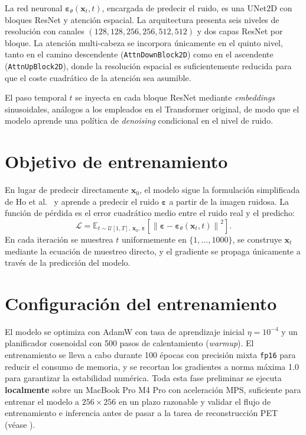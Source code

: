 La red neuronal $\boldsymbol{\varepsilon}_\theta(\mathbf{x}_t, t)$,
encargada de predecir el ruido, es una UNet2D con bloques ResNet
y atención espacial. La arquitectura presenta seis niveles de
resolución con canales $(128, 128, 256, 256, 512, 512)$ y dos
capas ResNet por bloque. La atención multi-cabeza se incorpora
únicamente en el quinto nivel, tanto en el camino descendente
(\texttt{AttnDownBlock2D}) como en el ascendente
(\texttt{AttnUpBlock2D}), donde la resolución espacial es
suficientemente reducida para que el coste cuadrático de la
atención sea asumible.

El paso temporal $t$ se inyecta en cada bloque ResNet mediante
\textit{embeddings} sinusoidales, análogos a los empleados en el
Transformer original, de modo que el modelo aprende una política
de \textit{denoising} condicional en el nivel de ruido.

\section{Objetivo de entrenamiento}
\label{sec:mariposas-loss}

En lugar de predecir directamente $\mathbf{x}_0$, el modelo sigue
la formulación simplificada de Ho et al.~\cite{ho2020ddpm} y
aprende a predecir el ruido $\boldsymbol{\varepsilon}$ a partir
de la imagen ruidosa. La función de pérdida es el error cuadrático
medio entre el ruido real y el predicho:
\begin{equation}
    \mathcal{L}
    = \mathbb{E}_{t \sim \mathcal{U}[1,T],\, \mathbf{x}_0,\,
                   \boldsymbol{\varepsilon}}
      \!\left[\left\|\boldsymbol{\varepsilon}
        - \boldsymbol{\varepsilon}_\theta\!\left(\mathbf{x}_t, t\right)
        \right\|^2\right].
\end{equation}
En cada iteración se muestrea $t$ uniformemente en
$\{1, \ldots, 1000\}$, se construye $\mathbf{x}_t$ mediante la
ecuación de muestreo directo, y el gradiente se propaga únicamente
a través de la predicción del modelo.

\section{Configuración del entrenamiento}
\label{sec:mariposas-config}

El modelo se optimiza con AdamW con tasa de aprendizaje inicial
$\eta = 10^{-4}$ y un planificador cosenoidal con 500 pasos de
calentamiento (\textit{warmup}). El entrenamiento se lleva a cabo
durante 100 épocas con precisión mixta \texttt{fp16} para reducir
el consumo de memoria, y se recortan los gradientes a norma
máxima 1.0 para garantizar la estabilidad numérica. Toda esta
fase preliminar se ejecuta \textbf{localmente} sobre un MacBook
Pro M4 Pro con aceleración MPS, suficiente para entrenar el
modelo a $256 \times 256$ en un plazo razonable y validar el
flujo de entrenamiento e inferencia antes de pasar a la tarea de
reconstrucción PET (véase ).

